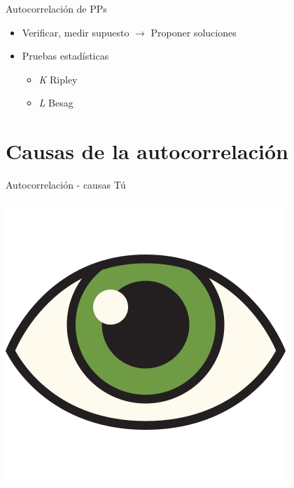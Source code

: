 \documentclass[
  11pt,
  ignorenonframetext,
]{beamer}
\providecommand{\tightlist}{%
  \setlength{\itemsep}{0pt}\setlength{\parskip}{0pt}}
\begin{document}
\begin{frame}{Autocorrelación de PPs}
\protect\hypertarget{autocorrelaciuxf3n-de-pps-3}{}
\begin{itemize}
\item
  Verificar, medir supuesto \(\rightarrow\) Proponer soluciones
\item
  Pruebas estadísticas

  \begin{itemize}
  \tightlist
  \item
    \emph{K} Ripley
  \item
    \emph{L} Besag
  \end{itemize}
\end{itemize}
\end{frame}

\hypertarget{causas-de-la-autocorrelaciuxf3n}{%
\section{Causas de la
autocorrelación}\label{causas-de-la-autocorrelaciuxf3n}}

\begin{frame}{Autocorrelación - causas}
\protect\hypertarget{autocorrelaciuxf3n---causas}{}
Tú

\begin{center}\includegraphics{Figuras/Observ} \end{center}
\end{frame}
\end{document}
